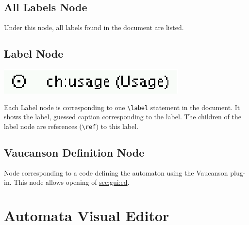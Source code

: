 \documentclass{article}
\begin{document}
\subsection{All Labels Node}

\label{ssec:all:labels:node}

Under this node, all labels found in the document are listed.

\subsection{Label Node}

\label{ssec:label:node}

\includegraphics[]{label_node.eps}

Each Label node is corresponding to one \verb+\label+ statement in the document.
It shows the label, guessed caption corresponding to the label. The children of
the label node are references (\verb+\ref+) to this label.


\subsection{Vaucanson Definition Node}

Node corresponding to a code defining the automaton using the Vaucanson plug-in.
This node allows opening of \hyperref{the GUI editor}{the GUI editor
(see Section~}{)}{sec:gui:ed}.



\section{Automata Visual Editor}
\end{document}
